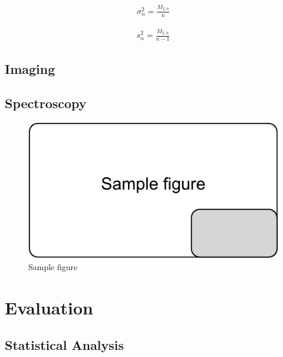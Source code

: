 \documentclass[11pt,sigconf]{acmart}
\begin{document}
\begin{equation} \label{eqn_w2}
  \begin{split}
    \sigma_{n}^{2}=\frac{M_{2,n}}{n}
  \end{split}
\end{equation}

\begin{equation} \label{eqn_w3}
  \begin{split}
    s_{n}^{2}=\frac{M_{2,n}}{n-1}
  \end{split}
\end{equation}






\subsection{Imaging}


\subsection{Spectroscopy}



\begin{figure}[htbp]
  \centering
  \includegraphics[scale=0.5]{sample-figure}
  \caption{Sample figure}
  \label{fig:sample}
\end{figure}




\section{Evaluation}

 
\subsection{Statistical Analysis}
\end{document}
